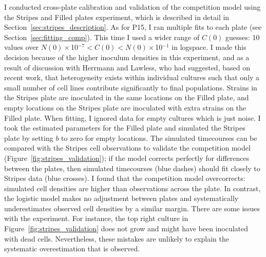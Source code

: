 \begin{multicols}{2}

I conducted cross-plate calibration and validation of the
competition model using the Stripes and Filled plates experiment,
which is described in detail in
Section~\ref{sec:stripes_description}.
%
As for P15, I ran multiple fits to each plate (see
Section~\ref{sec:fitting_comp}). This time I used a wider range of
\(C(0)\) guesses: 10 values over
\(N(0)\times\)10\(^{-7} < C(0) < N(0)\times\)10\(^{-1}\) in
logspace. I made this decision because of the higher inoculum
densities in this experiment, and as a result of discussion with
Herrmann and Lawless, who had suggested, based on recent work, that
heterogeneity exists within individual cultures such that only a small
number of cell lines contribute significantly to final
populations. Strains in the Stripes plate are inoculated in the same
locations on the Filled plate, and empty locations on the Stripes
plate are inoculated with extra strains on the Filled plate. When
fitting, I ignored data for empty cultures which is just noise. I took
the estimated parameters for the Filled plate and simulated the
Stripes plate by setting \(b\) to zero for empty locations. The
simulated timecourses can be compared with the Stripes cell
observations to validate the competition model
(Figure~\ref{fig:stripes_validation}); if the model corrects perfectly
for differences between the plates, then simulated timecourses (blue
dashes) should fit closely to Stripes data (blue crosses). I found
that the competition model overcorrects: simulated cell densities are
higher than observations across the plate. In contrast, the logistic
model makes no adjustment between plates and systematically
underestimates observed cell densities by a similar margin.
There are some issues with the experiment. For instance, the top right
culture in Figure~\ref{fig:stripes_validation} does not grow and might
have been inoculated with dead cells. Nevertheless, these mistakes are
unlikely to explain the systematic overestimation that is observed.


\end{multicols}
